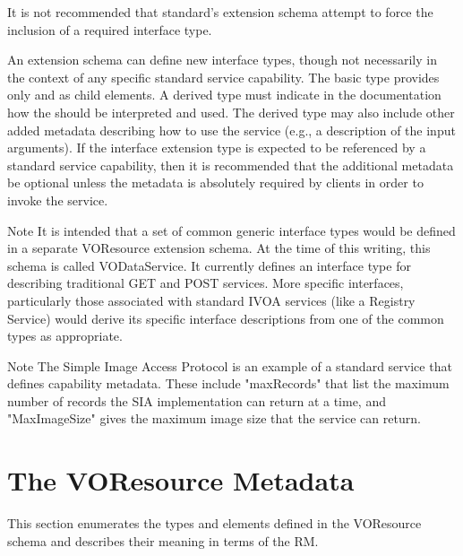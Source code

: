 \documentclass[11pt,a4paper]{ivoa}
\begin{document}
It is not recommended that standard's extension schema attempt to
force the inclusion of a required interface type.  



An extension schema can define new interface types, though not
necessarily in the context of any specific standard service
capability.  The basic  type provides only
 and  as child
elements.  A derived  type must indicate in
the documentation how the  should be
interpreted and used.  The derived type may also include other added
metadata describing how to use the service (e.g., a description of the
input arguments).  If the interface extension type is expected to be
referenced by a standard service capability, then it is recommended
that the additional metadata be optional unless the metadata is
absolutely required by clients in order to invoke the service.



\begin{admonition}{Note}
It is intended that a set of common generic interface types
would be defined in a separate VOResource extension schema.
At the time of this writing, this schema is called
VODataService.  It currently defines an interface type for
describing traditional GET and POST services.  More specific
interfaces, particularly those associated with standard IVOA
services (like a Registry Service) would derive its specific
interface descriptions from one of the common types as
appropriate.
\end{admonition}


\begin{admonition}{Note}
The Simple Image Access Protocol \citep{2009ivoa.spec.1111H} is an
example of a standard service that defines capability
metadata.  These include "maxRecords" that list the maximum
number of records the SIA implementation can return at a time,
and "MaxImageSize" gives the maximum image size that the
service can return.
\end{admonition}



\section{The VOResource Metadata}
\label{sect:metadata}


This section enumerates the types and elements defined in the
VOResource schema and describes their meaning in terms of the
RM.
\end{document}
